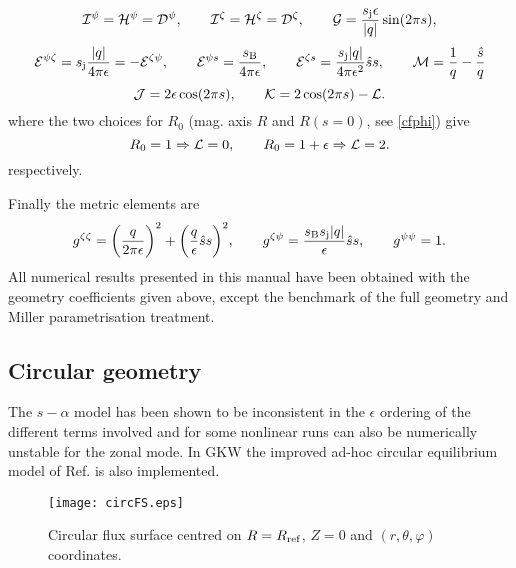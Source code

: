 \begin{equation}
{\cal I}^\psi = {\cal H}^\psi = {\cal D^\psi},
\qquad
{\cal I}^\zeta = {\cal H}^\zeta = {\cal D^\zeta},
\qquad
{\cal G} =  {s_{\rm j}\epsilon \over |q|} \sin ( 2 \pi s), 
\end{equation}
\begin{equation}
{\cal E}^{\psi \zeta} = s_{\rm j}{|q| \over 4 \pi \epsilon  } = - {\cal E}^{\zeta \psi},
\qquad
{\cal E}^{\psi s} =  {s_{\rm B} \over 4 \pi \epsilon},
\qquad
{\cal E}^{\zeta s} =  { s_{\rm j}|q| \over 4 \pi \epsilon^2} \hat s s,
\qquad
{\cal M} = {1 \over q}-{{\hat s} \over q}
\end{equation}
\begin{equation}
{\cal J} = 2 \epsilon \cos( 2 \pi s), 
\qquad
{\cal K} = 2 \cos(2 \pi s)- {\cal L}.
\end{equation}
where the two choices for $R_0$ (mag. axis $R$ and $R(s=0)$, see \ref{cfphi}) give
\begin{equation}
R_0=1 \Rightarrow {\cal L}=0, \qquad  
R_0=1+\epsilon \Rightarrow {\cal L}=2.
\end{equation}
respectively.

Finally the metric elements are
\begin{equation} 
g^{\zeta \zeta} = \biggl ( {q \over 2 \pi \epsilon} \biggr )^2 + \biggl ( {q \over\epsilon} \hat{s} s \biggr )^2 ,  \qquad 
g^{\zeta \psi} = {s_{\rm B}s_{\rm j}|q| \over \epsilon} \hat s s, \qquad 
g^{\psi \psi} = 1 .
\end{equation} 
All numerical results presented in this manual have been obtained with the geometry coefficients given above, except the benchmark
of the full geometry and Miller parametrisation treatment. 

\subsection{Circular geometry}
The $s-\alpha$ model has been shown to be inconsistent in the $\epsilon$ ordering of the different terms involved \cite{Lapillonne} and for some nonlinear runs can also be numerically unstable for the zonal mode.  
In GKW the improved ad-hoc circular equilibrium model of Ref. \cite{Lapillonne} is also implemented. 
\begin{figure}[h]
\begin{center}
\texttt{[image: circFS.eps]}
\caption{Circular flux surface centred on $R=R_{\mathrm{ref}}$, $Z=0$ and $(r,\theta,\varphi)$ coordinates.\label{circFS}}
\end{center}
\end{figure}

